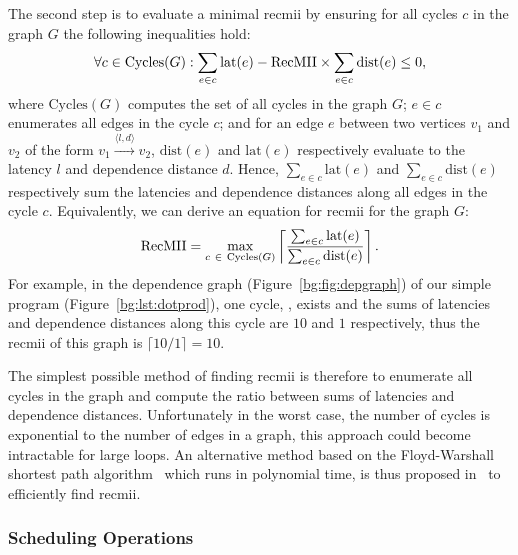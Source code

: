 The second step is to evaluate a minimal \gls{recmii} by ensuring for all
cycles $c$ in the graph $G$ the following inequalities hold:
\begin{equation}
    \forall c \in \mathrm{Cycles}(G):
        \sum_{e \in c} \mathrm{lat}(e) - \mathrm{RecMII} \times
        \sum_{e \in c} \mathrm{dist}(e) \leq 0,
\end{equation}
where $\mathrm{Cycles}(G)$ computes the set of all cycles in the graph $G$;
$e \in c$ enumerates all edges in the cycle $c$; and for an edge $e$ between
two vertices $v_1$ and $v_2$ of the form $v_1 \xrightarrow{\langle l, d
\rangle} v_2$, $\mathrm{dist}(e)$ and $\mathrm{lat}(e)$ respectively evaluate
to the latency $l$ and dependence distance $d$.  Hence, $\sum_{e \in c}
\mathrm{lat}(e)$ and $\sum_{e \in c} \mathrm{dist}(e)$ respectively sum
the latencies and dependence distances along all edges in the cycle $c$.
Equivalently, we can derive an equation for \gls{recmii} for the graph $G$:
\begin{equation}
    \RecMII = \max_{c~\in~\mathrm{Cycles}(G)}
        \left\lceil \frac{%
            \sum_{e \in c} \mathrm{lat}(e)
        }{%
            \sum_{e \in c} \mathrm{dist}(e)
        }
        \right\rceil.
\end{equation}
For example, in the dependence graph (Figure~\ref{bg:fig:depgraph}) of our
simple program (Figure~\ref{bg:lst:dotprod}), one cycle,
,
exists and the sums of latencies and dependence distances along this cycle are
$10$ and $1$ respectively, thus the \gls{recmii} of this graph is $\lceil 10 /
1 \rceil = 10$.

The simplest possible method of finding \gls{recmii} is therefore to enumerate
all cycles in the graph and compute the ratio between sums of latencies
and dependence distances.  Unfortunately in the worst case, the number of
cycles is exponential to the number of edges in a graph, this approach could
become intractable for large loops.  An alternative method based on the
Floyd-Warshall shortest path algorithm~\cite{floyd62} which runs in polynomial
time, is thus proposed in~\cite{rau94} to efficiently find \gls{recmii}.

\subsubsection{Scheduling Operations}

